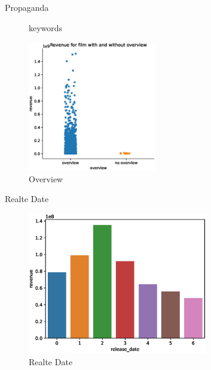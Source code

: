 \documentclass[
 size=14pt,
 paper=smartboard,  %
 mode=present, 		%
 display=slides, 	%
 style=tuliplab,  	%
 pauseslide,
 fleqn,leqno]{powerdot}
\begin{document}
\begin{slide}[toc=,bm=]{Propaganda}
\begin{figure}[htbp]
\begin{minipage}[t]{0.48\textwidth}
      \vspace{-1.4em}
      \caption{keywords}
    \end{minipage}
    \begin{minipage}[t]{0.48\textwidth}
      \centering
      \includegraphics[width=0.5\textwidth]{figures/overview.eps}
      \vspace{-1.4em}
      \caption{Overview}
    \end{minipage}
  \end{figure}
\end{slide}


\begin{slide}[toc=,bm=]{Realte Date}
  \begin{figure}[htbp]
    \centering
    \includegraphics[width=0.7\textwidth]{figures//release_date.eps}
    \caption{Realte Date}
  \end{figure}
\end{slide}
\end{document}
